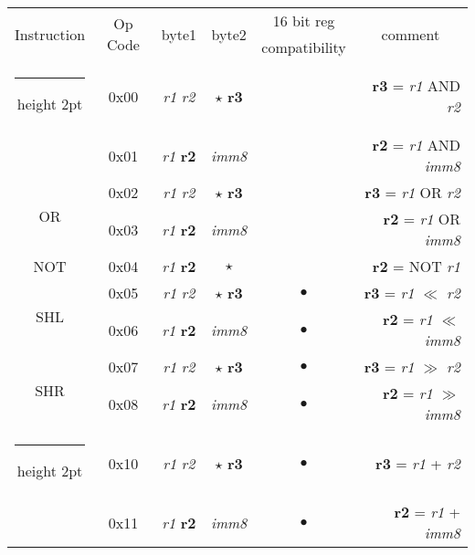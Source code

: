 \documentclass[a4paper,12pt]{article}
\makeatletter
\newcommand{\thickhline}{%
    \noalign {\ifnum 0=`}\fi \hrule height 2pt
    \futurelet \reserved@a \@xhline
}
\makeatother
\begin{document}
\begin{table}[H]
    \centering
    \begin{tabular}{|c|c|c|c|c|r|}
        \hline
        \multirow{2}{*}{Instruction} & \multirow{2}{*}{Op Code}  & \multirow{2}{*}{byte1} & \multirow{2}{*}{byte2} & 16 bit reg & \multicolumn{1}{c|}{\multirow{2}{*}{comment}}\\
         & & & & compatibility & \multicolumn{1}{c|}{} \\
        \thickhline
        \multirow{2}{*}{AND} & 0x00 & \textit{r1} \quad \textit{r2}  & $\star$ \quad \textbf{r3} & & \textbf{r3} = \textit{r1} AND \textit{r2}\\
        \cline{2-6}
                             & 0x01 & \textit{r1} \quad \textbf{r2}  & \textit{imm8} & & \textbf{r2} = \textit{r1} AND \textit{imm8}\\
        \hline
        \multirow{2}{*}{OR} & 0x02 & \textit{r1} \quad \textit{r2}  & $\star$ \quad \textbf{r3} & & \textbf{r3} = \textit{r1} OR \textit{r2}\\
        \cline{2-6}
                            & 0x03 & \textit{r1} \quad \textbf{r2}  & \textit{imm8} & & \textbf{r2} = \textit{r1} OR \textit{imm8}\\
        \hline
        NOT & 0x04 & \textit{r1} \quad \textbf{r2} & $\star$ & & \textbf{r2} = NOT \textit{r1} \\
        \hline
        \multirow{2}{*}{SHL} & 0x05 & \textit{r1} \quad \textit{r2} & $\star$ \quad \textbf{r3} & $\bullet$ & \textbf{r3} = \textit{r1} $\ll$ \textit{r2} \\
        \cline{2-6}
                            & 0x06 & \textit{r1} \quad \textbf{r2} & \textit{imm8} & $\bullet$ & \textbf{r2} = \textit{r1} $\ll$ \textit{imm8} \\
        \hline
        \multirow{2}{*}{SHR} & 0x07 & \textit{r1} \quad \textit{r2} & $\star$ \quad \textbf{r3} & $\bullet$ & \textbf{r3} = \textit{r1} $\gg$ \textit{r2} \\
        \cline{2-6}
                            & 0x08 & \textit{r1} \quad \textbf{r2} & \textit{imm8} & $\bullet$ & \textbf{r2} = \textit{r1} $\gg$ \textit{imm8} \\
        \thickhline
        \multirow{2}{*}{ADD} & 0x10 & \textit{r1} \quad \textit{r2}  & $\star$ \quad \textbf{r3} & $\bullet$ & \textbf{r3} = \textit{r1} + \textit{r2}\\
        \cline{2-6}
                             & 0x11 & \textit{r1} \quad \textbf{r2}  & \textit{imm8} & $\bullet$ & \textbf{r2} = \textit{r1} + \textit{imm8}\\

\end{tabular}
\end{table}
\end{document}
